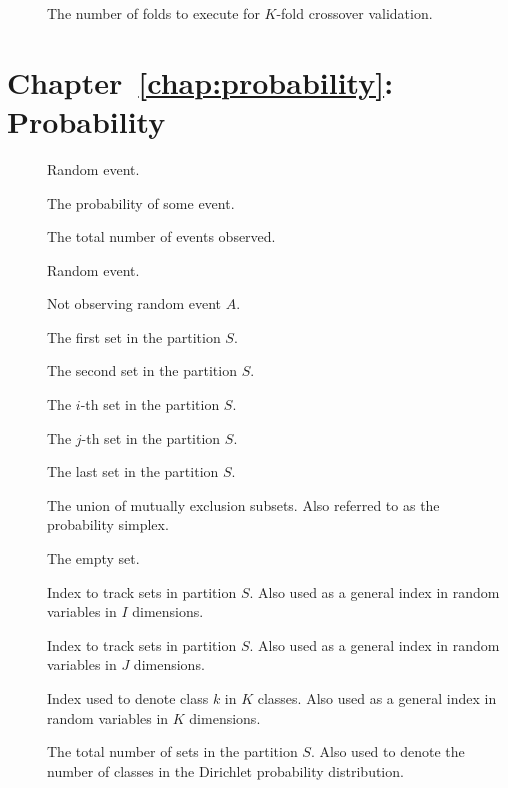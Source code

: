 \begin{description}
	\item [\parbox{2cm}{$K$}] The number of folds to execute for $K$-fold crossover validation.
\end{description}

\section{Chapter~\ref{chap:probability}: Probability}
\label{sec:symbols:probability}

\begin{description}
	\item [\parbox{2cm}{$A$}] Random event.
	\item [\parbox{2cm}{$P$}] The probability of some event.
	\item [\parbox{2cm}{$N$}] The total number of events observed.
	\item [\parbox{2cm}{$B$}] Random event.
	\item [\parbox{2cm}{$\bar{A}$}] Not observing random event $A$.
	\item [\parbox{2cm}{$B_{1}$}] The first set in the partition $S$.
	\item [\parbox{2cm}{$B_{2}$}] The second set in the partition $S$.
	\item [\parbox{2cm}{$B_{i}$}] The $i$-th set in the partition $S$.
	\item [\parbox{2cm}{$B_{j}$}] The $j$-th set in the partition $S$.
	\item [\parbox{2cm}{$B_{K}$}] The last set in the partition $S$.
	\item [\parbox{2cm}{$S$}] The union of mutually exclusion subsets. Also referred to as the probability simplex.
	\item [\parbox{2cm}{$\emptyset$}] The empty set.
	\item [\parbox{2cm}{$i$}] Index to track sets in partition $S$. Also used as a general index in random variables in $I$ dimensions.
	\item [\parbox{2cm}{$j$}] Index to track sets in partition $S$. Also used as a general index in random variables in $J$ dimensions.
	\item [\parbox{2cm}{$k$}] Index used to denote class $k$ in $K$ classes. Also used as a general index in random variables in $K$ dimensions.
	\item [\parbox{2cm}{$K$}] The total number of sets in the partition $S$. Also used to denote the number of classes in the Dirichlet probability distribution.

\end{description}
